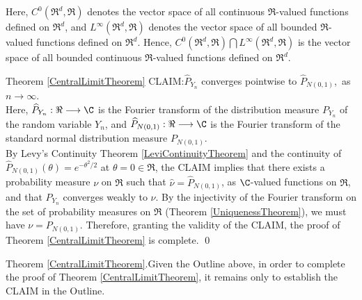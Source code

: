 \documentclass{article}
\begin{document}
\begin{remark}
\begin{itemize}
          Here, $C^{0}(\Re^{d},\Re)$ denotes the vector space of all continuous $\Re$-valued functions defined on $\Re^{d}$,
          and $L^{\infty}(\Re^{d},\Re)$ denotes the vector space of all bounded $\Re$-valued functions defined on $\Re^{d}$.
          Hence, $C^{0}(\Re^{d},\Re)\bigcap L^{\infty}(\Re^{d},\Re)$ is the vector space of all bounded continuous
          $\Re$-valued functions defined on $\Re^{d}$.
\end{itemize}
\end{remark}

\newpage
\proofoutlineof Theorem \ref{CentralLimitTheorem} \vskip 0.3cm \noindent
CLAIM:\quad $\widehat{P}_{Y_{n}}$ converges pointwise to $\widehat{P}_{N(0,1)}$,\, as $n \longrightarrow \infty$. \\

Here, $\widehat{P}_{Y_{n}}:\Re\longrightarrow\C$ is the Fourier transform of the distribution measure $P_{Y_{n}}$ of the random variable $Y_{n}$, and $\widehat{P}_{N(0,1)}:\Re\longrightarrow\C$ is the Fourier transform of the standard normal distribution measure $P_{N(0,1)}$. \\

By Levy's Continuity Theorem \ref{LeviContinuityTheorem} and the continuity of $\widehat{P}_{N(0,1)}(\theta)=e^{-\theta^{2}/2}$ at $\theta = 0 \in \Re$, the CLAIM implies that there exists a probability measure $\nu$ on $\Re$ such that $\widehat{\nu} = \widehat{P}_{N(0,1)}$, as $\C$-valued functions on $\Re$, and that $P_{Y_{n}}$ converges weakly to $\nu$.  By the injectivity of the Fourier transform on the set of probability measures on $\Re$ (Theorem \ref{UniquenessTheorem}), we must have $\nu = P_{N(0,1)}$.  Therefore, granting the validity of the CLAIM, the proof of Theorem \ref{CentralLimitTheorem} is complete. \qed

\vskip 1.0cm
\proofof Theorem \ref{CentralLimitTheorem}.\quad Given the Outline above, in order to complete the proof of Theorem \ref{CentralLimitTheorem}, it remains only to establish the CLAIM in the Outline.\\
\end{document}
